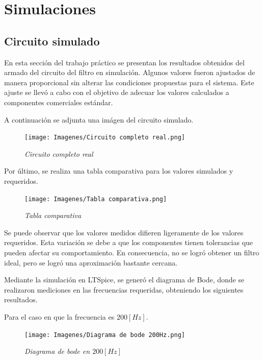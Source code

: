 \documentclass[12pt,A4paper,titlepage]{article}
\begin{document}
\section{Simulaciones}
\subsection{Circuito simulado}
\hspace{1mm} En esta sección del trabajo práctico se presentan los resultados obtenidos del armado del circuito del filtro en simulación. Algunos valores fueron ajustados de manera proporcional sin alterar las condiciones propuestas para el sistema. Este ajuste se llevó a cabo con el objetivo de adecuar los valores calculados a componentes comerciales estándar.

\bigskip
\hspace{1mm} A continuación se adjunta una imágen del circuito simulado.

\begin{figure}[!h] 
  \centering
  \texttt{[image: Imagenes/Circuito completo real.png]}
  \caption{\textit{Circuito completo real}}
\end{figure}

\hspace{1mm} Por último, se realiza una tabla comparativa para los valores simulados y requeridos. 

\begin{figure}[!h] 
  \centering
  \texttt{[image: Imagenes/Tabla comparativa.png]}
  \caption{\textit{Tabla comparativa}}
\end{figure}

\bigskip
\hspace{1mm} Se puede observar que los valores medidos difieren ligeramente de los valores requeridos. Esta variación se debe a que los componentes tienen tolerancias que pueden afectar su comportamiento. En consecuencia, no se logró obtener un filtro ideal, pero se logró una aproximación bastante cercana.

\bigskip
\hspace{1mm} Mediante la simulación en LTSpice, se generó el diagrama de Bode, donde se realizaron mediciones en las frecuencias requeridas, obteniendo los siguientes resultados.

\newpage
\hspace{1mm} Para el caso en que la frecuencia es \(200 [Hz]\).

\begin{figure}[!h] 
  \centering
  \texttt{[image: Imagenes/Diagrama de bode 200Hz.png]}
  \caption{\textit{Diagrama de bode en \(200 [Hz]\)}}
\end{figure}
\end{document}
